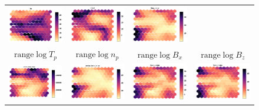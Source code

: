 \documentclass[utf8]{frontiersSCNS} %
\begin{document}
\begin{figure}[h!]
\begin{tabular}{CCCC}
		\includegraphics[width=4cm]{Amaya/comp-map-log_Ma} &
		\includegraphics[width=4cm]{Amaya/comp-map-log_C6to5} &
		\includegraphics[width=4cm]{Amaya/comp-map-log_Bmag_range}\hfill
		\\
		$\text{range} \log T_p $ & $\text{range} \log n_p$ & $\text{range} \log B_x$ & $\text{range} \log B_z$ \\
		\includegraphics[width=4cm]{Amaya/comp-map-log_proton_temp_range} &
		\includegraphics[width=4cm]{Amaya/comp-map-log_proton_density_range} &
		\includegraphics[width=4cm]{Amaya/comp-map-log_Bgsm_x_range} &
		\includegraphics[width=4cm]{Amaya/comp-map-log_Bgsm_z_range}\hfill

\end{tabular}
\end{figure}
\end{document}
